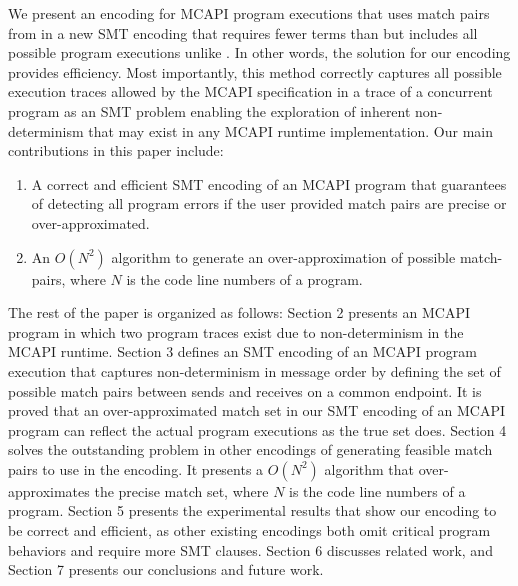 We present an encoding for MCAPI program executions that uses match pairs from \cite{sharma:fmcad09} in a new SMT encoding that requires fewer terms than \cite{elwakil:padtad10} but includes all possible program executions unlike \cite{elwakil:padtad10}. In other words, the solution for our encoding provides efficiency. Most importantly, this method correctly captures all possible execution traces allowed by the MCAPI specification in a trace of a concurrent program as an SMT problem enabling the exploration of inherent non-determinism that may exist in any MCAPI runtime implementation.
Our main contributions in this paper include:

\begin{enumerate}
\item  A correct and efficient SMT encoding of an MCAPI program that guarantees of detecting all program errors if the user provided match pairs are precise or over-approximated.
\item  An $O(N^2)$ algorithm to generate an over-approximation of possible match-pairs, where $N$ is the code line numbers of a program.
\end{enumerate}

The rest of the paper is organized as follows:
Section 2 presents an MCAPI program in which two program traces exist due to non-determinism in the MCAPI runtime. Section 3 defines an SMT encoding of an MCAPI program execution that captures non-determinism in message order by defining the set of possible match pairs between sends and receives on a common endpoint. It is proved that an over-approximated match set in our SMT encoding of an MCAPI program can reflect the actual program executions as the true set does. Section 4 solves the outstanding problem in other encodings of generating feasible match pairs to use in the encoding. It presents a $O(N^2)$ algorithm that over-approximates the precise match set, where $N$ is the code line numbers of a program. Section 5 presents the experimental results that show our encoding to be correct and efficient, as other existing encodings both omit critical program behaviors and require more SMT clauses. Section 6 discusses related
work, and Section 7 presents our conclusions and future work.


